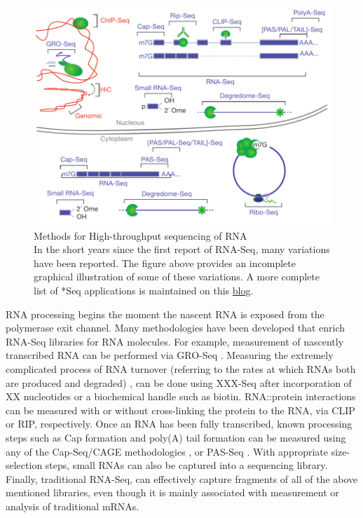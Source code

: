 \begin{figure}[htbp]
	\centering 
	\includegraphics{Figures/RNA_Sequencing_methodologies.pdf}
	\caption[Methods for High-throughput sequencing of RNA]
	{
		Methods for High-throughput sequencing of RNA\\[0.25cm]
		In the short years since the first report of RNA-Seq, many variations have been reported. The figure above provides an incomplete graphical illustration of some of these variations. A more complete list of *Seq applications is maintained on this \href{http://liorpachter.wordpress.com/seq/}{blog}.
	}
	\label{fig:htsMethods}
\end{figure}

RNA processing begins the moment the nascent RNA is exposed from the polymerase exit channel. Many methodologies have been developed that enrich RNA-Seq libraries for RNA molecules. For example, measurement of nascently transcribed RNA can be performed via GRO-Seq \citep{Core2008a}. Measuring the extremely complicated process of RNA turnover (referring to the rates at which RNAs both are produced and degraded) \citep{Ghosh2010a}, can be done using XXX-Seq after incorporation of XX nucleotides or a biochemical handle such as biotin. 
RNA::protein interactions can be measured with or without cross-linking the protein to the RNA, via CLIP or RIP, respectively. Once an RNA has been fully transcribed, known processing steps such as Cap formation and poly(A) tail formation can be measured using any of the Cap-Seq/CAGE methodologies \citep{Shiraki2003a}, or PAS-Seq \citep{Shepard2011}. With appropriate size-selection steps, small RNAs \citep{Ghildiyal2008} can also be captured into a sequencing library. Finally, traditional RNA-Seq, can effectively capture fragments of all of the above mentioned libraries, even though it is mainly associated with measurement or analysis of traditional mRNAs.

